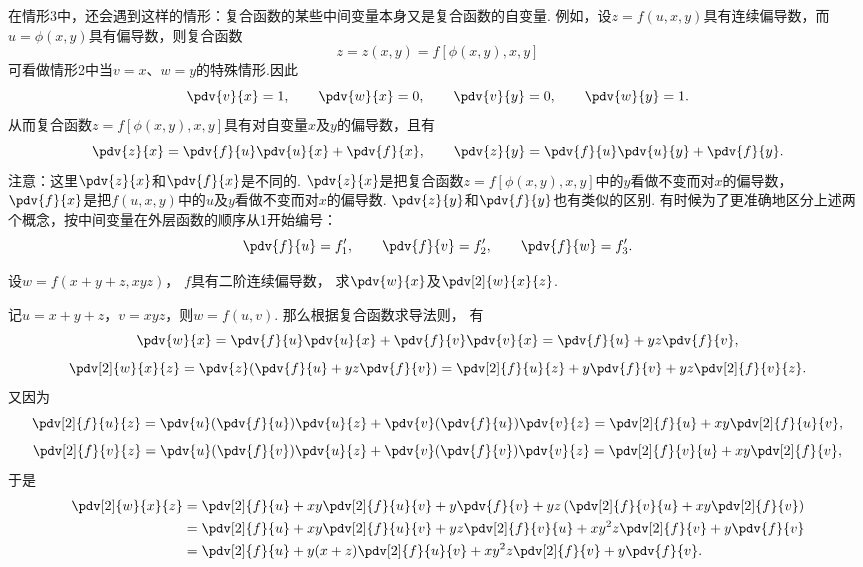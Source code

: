 在情形3中，还会遇到这样的情形：复合函数的某些中间变量本身又是复合函数的自变量.
例如，设\(z = f(u,x,y)\)具有连续偏导数，而\(u=\phi(x,y)\)具有偏导数，则复合函数\begin{equation*}
z = z(x,y) = f[\phi(x,y),x,y]
\end{equation*}可看做情形2中当\(v=x\)、\(w=y\)的特殊情形.因此\begin{equation*}
	\pdv{v}{x} = 1, \qquad
	\pdv{w}{x} = 0, \qquad
	\pdv{v}{y} = 0, \qquad
	\pdv{w}{y} = 1.
\end{equation*}
从而复合函数\(z = f[\phi(x,y),x,y]\)具有对自变量\(x\)及\(y\)的偏导数，且有\begin{equation*}
	\pdv{z}{x} = \pdv{f}{u} \pdv{u}{x} + \pdv{f}{x},
	\qquad
	\pdv{z}{y} = \pdv{f}{u} \pdv{u}{y} + \pdv{f}{y}.
\end{equation*}
注意：这里\(\pdv{z}{x}\)和\(\pdv{f}{x}\)是不同的.
\(\pdv{z}{x}\)是把复合函数\(z = f[\phi(x,y),x,y]\)中的\(y\)看做不变而对\(x\)的偏导数，
\(\pdv{f}{x}\)是把\(f(u,x,y)\)中的\(u\)及\(y\)看做不变而对\(x\)的偏导数.
\(\pdv{z}{y}\)和\(\pdv{f}{y}\)也有类似的区别.
有时候为了更准确地区分上述两个概念，按中间变量在外层函数的顺序从1开始编号：\begin{equation*}
	\pdv{f}{u} = f_1', \qquad
	\pdv{f}{v} = f_2', \qquad
	\pdv{f}{w} = f_3'.
\end{equation*}

\begin{example}
设\(w = f(x+y+z,xyz)\)，
\(f\)具有二阶连续偏导数，
求\(\pdv{w}{x}\)及\(\pdv[2]{w}{x}{z}\).
\begin{solution}
记\(u = x+y+z\)，\(v = xyz\)，则\(w = f(u,v)\).
那么根据复合函数求导法则，
有\begin{equation*}
	\pdv{w}{x} = \pdv{f}{u} \pdv{u}{x} + \pdv{f}{v} \pdv{v}{x}
	= \pdv{f}{u} + yz \pdv{f}{v},
\end{equation*}\begin{equation*}
	\pdv[2]{w}{x}{z} = \pdv{z}(\pdv{f}{u} + yz \pdv{f}{v})
	= \pdv[2]{f}{u}{z} + y\pdv{f}{v} + yz \pdv[2]{f}{v}{z}.
\end{equation*}
又因为\begin{equation*}
	\pdv[2]{f}{u}{z}
	= \pdv{u}(\pdv{f}{u}) \pdv{u}{z} + \pdv{v}(\pdv{f}{u}) \pdv{v}{z}
	= \pdv[2]{f}{u} + xy \pdv[2]{f}{u}{v},
\end{equation*}\begin{equation*}
	\pdv[2]{f}{v}{z}
	= \pdv{u}(\pdv{f}{v}) \pdv{u}{z} + \pdv{v}(\pdv{f}{v}) \pdv{v}{z}
	= \pdv[2]{f}{v}{u} + xy \pdv[2]{f}{v},
\end{equation*}
于是\begin{align*}
	\pdv[2]{w}{x}{z}
	&= \pdv[2]{f}{u} + xy \pdv[2]{f}{u}{v}
	+ y\pdv{f}{v} + yz \left( \pdv[2]{f}{v}{u} + xy \pdv[2]{f}{v} \right) \\
	&= \pdv[2]{f}{u}
	+ xy \pdv[2]{f}{u}{v} + yz \pdv[2]{f}{v}{u}
	+ x y^2 z \pdv[2]{f}{v}
	+ y \pdv{f}{v} \\
	&= \pdv[2]{f}{u}
	+ y(x+z) \pdv[2]{f}{u}{v}
	+ x y^2 z \pdv[2]{f}{v}
	+ y \pdv{f}{v}.
\end{align*}
\end{solution}
\end{example}

